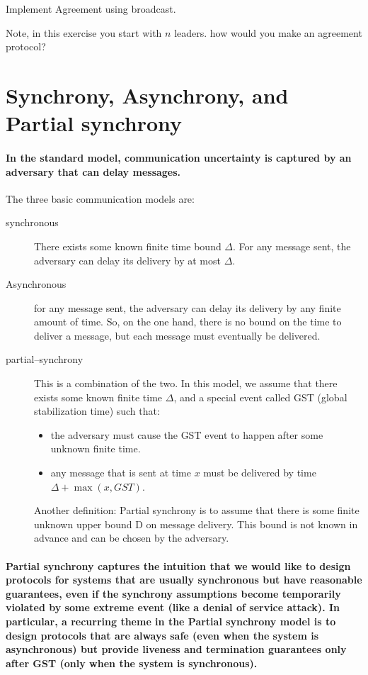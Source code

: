 \begin{xca}
Implement Agreement using broadcast.

Note, in this exercise you start with $n$ leaders. how would you
make an agreement protocol?
\end{xca}


\section{Synchrony, Asynchrony, and Partial synchrony }

\paragraph{In the standard model, communication uncertainty is captured by an
adversary that can delay messages. }

The three basic communication models are: 
\begin{description}
\item [{synchronous}] There exists some known finite time bound $\Delta$.
For any message sent, the adversary can delay its delivery by at most
$\Delta$.
\item [{Asynchronous}] for any message sent, the adversary can delay its
delivery by any finite amount of time. So, on the one hand, there
is no bound on the time to deliver a message, but each message must eventually be delivered.
\item [{partial--synchrony}] This is a combination of the two. In
this model, we assume that there exists some known finite time $\Delta$,
and a special event called GST (global stabilization time) such that:
\begin{itemize}
\item the adversary must cause the GST event to happen after some unknown
finite time.
\item any message that is sent at time $x$ must be delivered by time $\Delta+\max\left(x,GST\right)$.
\end{itemize}
Another definition: Partial synchrony is to assume that there is some
finite unknown upper bound \textgreek{D} on message delivery. This
bound is not known in advance and can be chosen by the adversary.
\end{description}

\paragraph{Partial synchrony captures the intuition that we would like to design
protocols for systems that are usually synchronous but have reasonable
guarantees, even if the synchrony assumptions become temporarily violated
by some extreme event (like a denial of service attack). In particular,
a recurring theme in the Partial synchrony model is to design protocols
that are always safe (even when the system is asynchronous) but provide
liveness and termination guarantees only after GST (only when the system is synchronous).}

